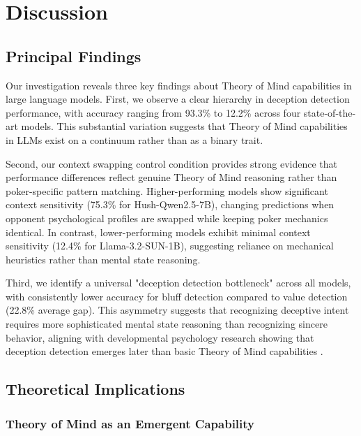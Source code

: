 \section{Discussion}
\label{sec:discussion}

\subsection{Principal Findings}
\label{subsec:principal_findings}

Our investigation reveals three key findings about Theory of Mind capabilities in large language models. First, we observe a clear hierarchy in deception detection performance, with accuracy ranging from 93.3\% to 12.2\% across four state-of-the-art models. This substantial variation suggests that Theory of Mind capabilities in LLMs exist on a continuum rather than as a binary trait.

Second, our context swapping control condition provides strong evidence that performance differences reflect genuine Theory of Mind reasoning rather than poker-specific pattern matching. Higher-performing models show significant context sensitivity (75.3\% for Hush-Qwen2.5-7B), changing predictions when opponent psychological profiles are swapped while keeping poker mechanics identical. In contrast, lower-performing models exhibit minimal context sensitivity (12.4\% for Llama-3.2-SUN-1B), suggesting reliance on mechanical heuristics rather than mental state reasoning.

Third, we identify a universal "deception detection bottleneck" across all models, with consistently lower accuracy for bluff detection compared to value detection (22.8\% average gap). This asymmetry suggests that recognizing deceptive intent requires more sophisticated mental state reasoning than recognizing sincere behavior, aligning with developmental psychology research showing that deception detection emerges later than basic Theory of Mind capabilities \cite{wellman2001meta}.

\subsection{Theoretical Implications}
\label{subsec:theoretical_implications}

\subsubsection{Theory of Mind as an Emergent Capability}

